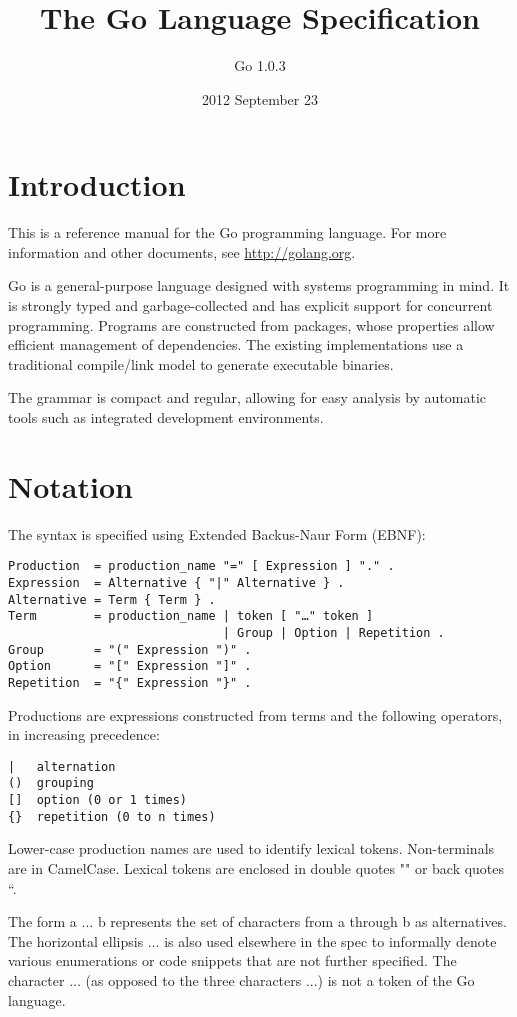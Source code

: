 \documentclass[UTF8]{article}
\title{The Go Language Specification}
\author{Go 1.0.3}
\date{2012 September 23}
\begin{document}
\maketitle

\section*{Introduction}
This is a reference manual for the Go programming language. For
more information and other documents, see \url{http://golang.org}.

Go is a general-purpose language designed with systems programming
in mind. It is strongly typed and garbage-collected and has explicit
support for concurrent programming. Programs are constructed from
packages, whose properties allow efficient management of dependencies.
The existing implementations use a traditional compile/link model
to generate executable binaries.

The grammar is compact and regular, allowing for easy analysis by
automatic tools such as integrated development environments.

\section*{Notation}

The syntax is specified using Extended Backus-Naur Form (EBNF):

\begin{Verbatim}[frame=single]
Production  = production_name "=" [ Expression ] "." .
Expression  = Alternative { "|" Alternative } .
Alternative = Term { Term } .
Term        = production_name | token [ "…" token ]
                              | Group | Option | Repetition .
Group       = "(" Expression ")" .
Option      = "[" Expression "]" .
Repetition  = "{" Expression "}" .
\end{Verbatim}

Productions are expressions constructed from terms and the following operators, in increasing precedence:

\begin{Verbatim}[frame=single]
|   alternation
()  grouping
[]  option (0 or 1 times)
{}  repetition (0 to n times)
\end{Verbatim}

Lower-case production names are used to identify lexical tokens.
Non-terminals are in CamelCase. Lexical tokens are enclosed in
double quotes "" or back quotes ``.

The form a $\ldots$ b represents the set of characters from a through b
as alternatives. The horizontal ellipsis $\ldots$ is also used elsewhere
in the spec to informally denote various enumerations or code
snippets that are not further specified. The character $\ldots$ (as opposed
to the three characters ...) is not a token of the Go language.
\end{document}
